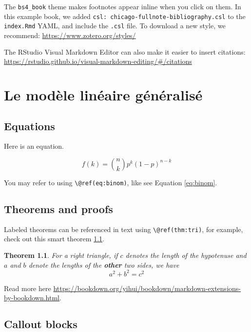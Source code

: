 \documentclass[
]{book}
\newtheorem{theorem}{Theorem}[chapter]
\theoremstyle{definition}
\theoremstyle{definition}
\theoremstyle{definition}
\theoremstyle{definition}
\theoremstyle{remark}
\begin{document}
The \texttt{bs4\_book} theme makes footnotes appear inline when you click on them. In this example book, we added \texttt{csl:\ chicago-fullnote-bibliography.csl} to the \texttt{index.Rmd} YAML, and include the \texttt{.csl} file. To download a new style, we recommend: \url{https://www.zotero.org/styles/}

The RStudio Visual Markdown Editor can also make it easier to insert citations: \url{https://rstudio.github.io/visual-markdown-editing/\#/citations}

\hypertarget{glm}{%
\chapter{Le modèle linéaire généralisé}\label{glm}}

\hypertarget{equations}{%
\section{Equations}\label{equations}}

Here is an equation.

\begin{equation} 
  f\left(k\right) = \binom{n}{k} p^k\left(1-p\right)^{n-k}
  \label{eq:binom}
\end{equation}

You may refer to using \texttt{\textbackslash{}@ref(eq:binom)}, like see Equation \eqref{eq:binom}.

\hypertarget{theorems-and-proofs}{%
\section{Theorems and proofs}\label{theorems-and-proofs}}

Labeled theorems can be referenced in text using \texttt{\textbackslash{}@ref(thm:tri)}, for example, check out this smart theorem \ref{thm:tri}.

\begin{theorem}
\protect\hypertarget{thm:tri}{}\label{thm:tri}For a right triangle, if \(c\) denotes the \emph{length} of the hypotenuse
and \(a\) and \(b\) denote the lengths of the \textbf{other} two sides, we have
\[a^2 + b^2 = c^2\]
\end{theorem}

Read more here \url{https://bookdown.org/yihui/bookdown/markdown-extensions-by-bookdown.html}.

\hypertarget{callout-blocks}{%
\section{Callout blocks}\label{callout-blocks}}
\end{document}
